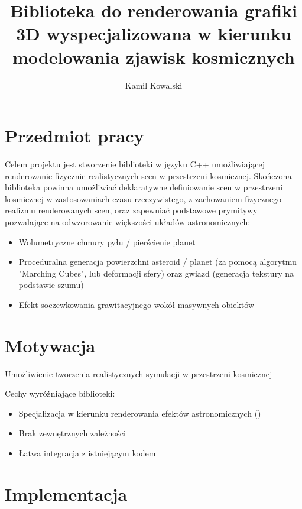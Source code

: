 \documentclass[12pt]{report}
\title{Biblioteka do renderowania grafiki 3D wyspecjalizowana w kierunku modelowania zjawisk kosmicznych}
\author{Kamil Kowalski}
\begin{document}



\clearpage

\section{Przedmiot pracy}

Celem projektu jest stworzenie biblioteki w języku C++ umożliwiającej renderowanie fizycznie realistycznych scen w przestrzeni kosmicznej.
Skończona biblioteka powinna umożliwiać deklaratywne definiowanie scen w przestrzeni kosmicznej w zastosowaniach czasu rzeczywistego, z zachowaniem fizycznego realizmu renderowanych scen, oraz zapewniać podstawowe prymitywy pozwalające na odwzorowanie większości układów astronomicznych:

\begin{itemize}

\item Wolumetryczne chmury pyłu / pierścienie planet
\item Proceduralna generacja powierzchni asteroid / planet (za pomocą algorytmu "Marching Cubes", lub deformacji sfery) oraz gwiazd (generacja tekstury na podstawie szumu)
\item Efekt soczewkowania grawitacyjnego wokół masywnych obiektów

\end{itemize}

\section{Motywacja}

Umożliwienie tworzenia realistycznych symulacji w przestrzeni kosmicznej

Cechy wyróżniające biblioteki:
\begin{itemize}
    \item Specjalizacja w kierunku renderowania efektów astronomicznych ()
    \item Brak zewnętrznych zależności
    \item Łatwa integracja z istniejącym kodem
\end{itemize}

\section{Implementacja}
\end{document}
